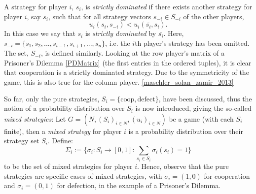 A strategy for player $i$, $s_{i}$, is \textit{strictly dominated} if there
exists another strategy for player $i$, say $\bar{s_{i}}$, such that for all
strategy vectors $s_{-i} \in S_{-i}$ of the other players, 
$$
    u_{i}(s_{i}, s_{-i}) < u_{i}(\bar{s_{i}}, s_{i}).
$$
In this case we say that $s_{i}$ is \textit{strictly dominated} by
$\bar{s_{i}}$. Here, $s_{-i} = \{s_{1}, s_{2}, ..., s_{i-1}, s_{i+1}, ...,
s_{n}\}$, i.e. the $i$th player's strategy has been omitted. The set, $S_{-i}$,
is defined similarly. Looking at the row player's matrix of a Prisoner's Dilemma
\ref{PDMatrix} (the first entries in the ordered tuples), it is clear that
cooperation is a strictly dominated strategy. Due to the symmetricity of the
game, this is also true for the column player. \ref{maschler_solan_zamir_2013}



So far, only the pure strategies, $S_{i}=\{\text{coop}, \text{defect}\}$, have
been discussed, thus the notion of a probability distribution over $S_{i}$ is
now introduced, giving the so-called \textit{mixed strategies}:
Let $G=(N, (S_{i})_{i \in N}, (u_{i})_{i \in N})$ be a game (with each $S_{i}$
finite), then a \textit{mixed strategy} for player $i$ is a probability
distribution over their strategy set $S_{i}$. Define:
$$
\Sigma_{i} := \{\sigma_{i} : S_{i} \to [0, 1] : \sum_{s_{i} \in S_{i}}{\sigma_{i}(s_{i})} = 1\}   
$$
to be the set of mixed strategies for player $i$. Hence, observe that the pure
strategies are specific cases of mixed strategies, with $\sigma_{i} = (1, 0)$
for cooperation and $\sigma_{i} = (0, 1)$ for defection, in the example of a
Prisoner's Dilemma.